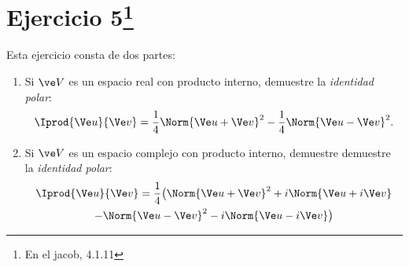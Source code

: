 \section*{Ejercicio 5\footnote{En el jacob, 4.1.11}}
Esta ejercicio consta de dos partes:
\begin{enumerate}
	\item Si $\ve V$ es un espacio real con producto interno, demuestre la \emph{identidad polar}:
	\[ \Iprod{\Ve u}{\Ve v}  =\frac{1}{4}\Norm{\Ve u+\Ve v}^2-\frac{1}{4}\Norm{\Ve u-\Ve v}^2.  \] 
	\item Si $\ve V$ es un espacio complejo con producto interno, demuestre demuestre la \emph{identidad polar}:
	\begin{multline*}
		\Iprod{\Ve u}{\Ve v} = \frac{1}{4} \big(\Norm{\Ve u+\Ve v}^2+i\Norm{\Ve u+i\Ve v}\\-\Norm{\Ve u-\Ve v}^2-i\Norm{\Ve u-i\Ve v}\big)
	\end{multline*}
\end{enumerate}

